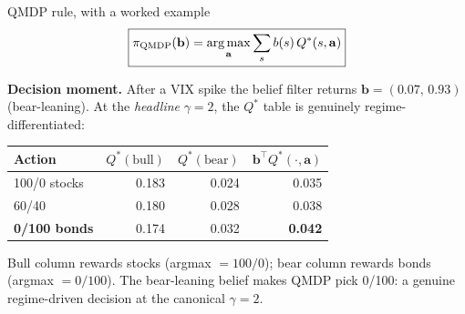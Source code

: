 \documentclass[11pt,aspectratio=169]{beamer}
\newcommand{\argmax}{\operatorname*{arg\,max}}
\newcommand{\bel}{\mathbf{b}}
\begin{document}
\begin{frame}{QMDP rule, with a worked example}
\[
\boxed{\pi_{\rm QMDP}(\mathbf{b}) = \argmax_{\mathbf{a}} \sum_s b(s)\,Q^\ast(s, \mathbf{a})}
\]

\smallskip
\textbf{Decision moment.} After a VIX spike the belief filter returns $\bel=(0.07,\,0.93)$ (bear-leaning). At the \emph{headline} $\gamma{=}2$, the $Q^\ast$ table is genuinely regime-differentiated:

\centering\small\renewcommand{\arraystretch}{1.1}
\begin{tabular}{l rr r}
\toprule
\textbf{Action} & $Q^\ast(\text{bull})$ & $Q^\ast(\text{bear})$ & $\bel^\top Q^\ast(\cdot,\mathbf{a})$ \\
\midrule
100/0 stocks       & 0.183 & 0.024 & 0.035 \\
60/40              & 0.180 & 0.028 & 0.038 \\
\rowcolor{cg!20}\textbf{0/100 bonds} & 0.174 & 0.032 & \textbf{0.042} \\
\bottomrule
\end{tabular}

\smallskip\small Bull column rewards stocks (argmax $=100/0$); bear column rewards bonds (argmax $=0/100$). The bear-leaning belief makes QMDP pick \alert{0/100}: a genuine regime-driven decision at the canonical $\gamma{=}2$.
\end{frame}
\end{document}
